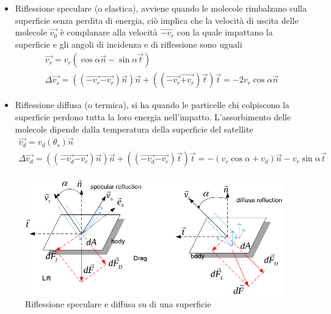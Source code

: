 \begin{itemize}
  \item Riflessione speculare (o elastica), avviene quando le molecole
  rimbalzano sulla superficie senza perdita di energia, ciò implica che la
  velocità di uscita delle molecole $\vec{v_0}$ è complanare alla velocità
  $\vec{-v_r}$ con la quale impattano la superficie e gli angoli di incidenza e
  di riflessione sono uguali
\begin{equation}
\begin{array}{l}
\vec{v_r}=v_r(\cos{\alpha \vec{n}}-\sin{\alpha \vec{t}}) \\
\Delta \vec{v_s}=((\vec{-v_r}\vec{-v_r})\vec{n})\vec{n} +
((\vec{-v_r}\vec{+v_r})\vec{t})\vec{t} = -2v_r\cos{\alpha \vec{n}}
\end{array}
\end{equation}
  \item Riflessione diffusa (o termica), si ha quando le particelle chi
  colpiscono la superficie perdono tutta la loro energia nell'impatto.
  L'assorbimento delle molecole dipende dalla temperatura della superficie del
  satellite
\begin{equation}
\begin{array}{l}
\vec{v_d}=v_d(\theta_s)\vec{n} \\
\Delta\vec{v_d}=((\vec{-v_d}\vec{-v_r})\vec{n})\vec{n} +
((\vec{-v_d}\vec{-v_r})\vec{t})\vec{t}
= -(v_r\cos{\alpha}+v_d)\vec{n}-v_r\sin{\alpha}\vec{t}
\end{array}
\end{equation}
\end{itemize}

\begin{figure}[htp]
\begin{center}
  \includegraphics[width=\textwidth]{modelling/orbit_dynamics/image/riflessione.png}
  \caption{Riflessione speculare e diffusa su di una superficie}
  \label{fig:riflessione}
\end{center}
\end{figure}


